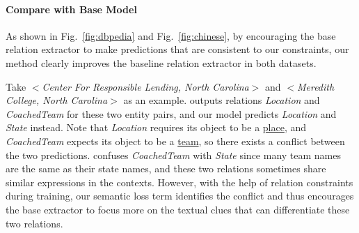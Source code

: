 \paragraph{Compare with Base Model}
As shown in Fig.~\ref{fig:dbpedia} and Fig.~\ref{fig:chinese}, by encouraging the base relation extractor to make predictions that are consistent to our constraints, our \SL method clearly improves the baseline relation extractor in both datasets.

Take $<$\emph{Center For Responsible Lending, North Carolina}$>$ and $<$\emph{Meredith College, North Carolina}$>$ as an example.
\base outputs relations \emph{Location} and \emph{CoachedTeam} for these two entity pairs, and our \SL model predicts \emph{Location} and \emph{State} instead.
Note that \emph{Location} requires its object to be a \underline{place}, and \emph{CoachedTeam} expects its object to be a \underline{team}, so there exists a conflict between the two predictions.
\base confuses \emph{CoachedTeam} with \emph{State} since many team names are the same as their state names, and these two relations sometimes share similar expressions in the contexts. 
However, with the help of relation constraints during training, our semantic loss term identifies the conflict and thus encourages the base extractor to focus more on the textual clues that can differentiate these two relations.

